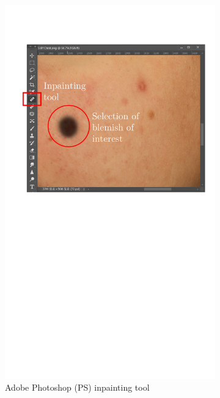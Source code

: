 \begin{spacing}{1.5}
\begin{figure}[t!]
    \centering
    \begin{subfigure}{.97\textwidth}
        \centering
        \includegraphics[width=0.97\columnwidth]{Chapter4/ps_ui.pdf}
        \caption{Adobe Photoshop (PS) inpainting tool}
    \end{subfigure}\hfill
    \begin{subfigure}{.97\textwidth}
        \centering

\end{subfigure}
\end{figure}
\end{spacing}
